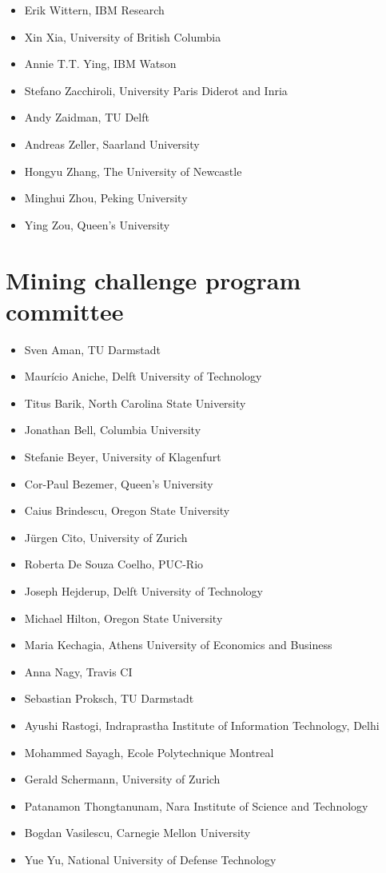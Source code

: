\documentclass[a4paper]{report}
\begin{document}
\begin{itemize}
\item Erik Wittern, IBM Research
\item Xin Xia, University of British Columbia
\item Annie T.T. Ying, IBM Watson
\item Stefano  Zacchiroli, University Paris Diderot and Inria
\item Andy Zaidman, TU Delft
\item Andreas  Zeller, Saarland University
\item Hongyu Zhang, The University of Newcastle
\item Minghui  Zhou, Peking University
\item Ying Zou, Queen's University
\end{itemize}

\section{Mining challenge program committee}

\begin{itemize}
\item Sven Aman, TU Darmstadt
\item Maurício Aniche, Delft University of Technology
\item Titus Barik, North Carolina State University
\item Jonathan Bell, Columbia University
\item Stefanie Beyer, University of Klagenfurt
\item Cor-Paul Bezemer, Queen's University
\item Caius Brindescu, Oregon State University
\item Jürgen Cito, University of Zurich
\item Roberta De Souza Coelho, PUC-Rio
\item Joseph Hejderup, Delft University of Technology
\item Michael    Hilton, Oregon State University
\item Maria Kechagia, Athens University of Economics and Business
\item Anna Nagy, Travis CI
\item Sebastian Proksch, TU Darmstadt
\item Ayushi Rastogi, Indraprastha Institute of Information Technology, Delhi
\item Mohammed Sayagh, Ecole Polytechnique Montreal
\item Gerald  Schermann, University of Zurich
\item Patanamon Thongtanunam, Nara Institute of Science and Technology
\item Bogdan Vasilescu, Carnegie Mellon University
\item Yue Yu, National University of Defense Technology
\end{itemize}
\end{document}
